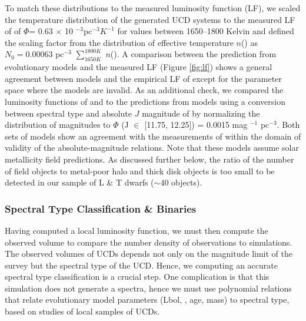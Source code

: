 \documentclass[manuscript]{aastex63}
\begin{document}
To match these distributions to the measured luminosity function (LF), we scaled the temperature distribution of the generated UCD systems to the measured LF of \cite{2019ApJS..240...19K} of $\Phi$= 0.63 $\times$ 10 $^{-3}$pc$^{-3} K^{-1}$ for \teff values between 1650--1800 Kelvin and defined the scaling factor from the distribution of effective temperature $n$(\teff) as $N_0= 0.00063$ pc$^{-3}$ $\sum_{1650 K} ^ {1800 K}$ $n$(\teff). A comparison between the prediction from evolutionary models and the measured LF (Figure \ref{fig:lf}) shows a general agreement between models and the empirical LF of \cite{2019ApJS..240...19K} except for the parameter space where the models are invalid. As an additional check, we compared the luminosity functions of \cite{2019arXiv190604166B} and \cite{2007astro.ph..2034C} to the predictions from models using a conversion between spectral type and absolute $J$ magnitude of \cite{2012ApJS..201...19D} by normalizing the distribution of magnitudes to $\Phi$ (J $\in$ [11.75, 12.25]) = 0.0015 mag $^{-1}$ pc$^{-3}$. Both sets of models show an agreement with the measurements of \cite{2019arXiv190604166B} within the domain of validity of the absolute-magnitude relations. Note that these models assume solar metallicity field predictions. As discussed further below, the ratio of the number of field objects to metal-poor halo and thick disk objects is too small to be detected in our sample of L \& T dwarfs ($\sim$40 objects).

\subsubsection{Spectral Type Classification \& Binaries}
Having computed a local luminosity function, we must then compute the observed volume to compare the number density of observations to simulations. The observed volumes of UCDs depends not only on the magnitude limit of the survey but the spectral type of the UCD. Hence, we computing an accurate spectral type classification is a crucial step. One complication is that this simulation does not generate a spectra, hence we must use polynomial relations that relate evolutionary model parameters (Lbol, \teff, age, mass) to spectral type, based on studies of local samples of UCDs.
\end{document}
